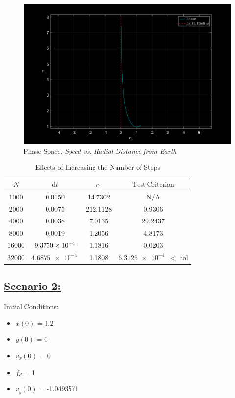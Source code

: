 \documentclass{article}
\newcommand{\cw}{\color{white}}
\begin{document}
\begin{figure}[!h]
    \centering
    \includegraphics[width=\textwidth]{fig/phase1.png}
    \caption{Phase Space, \textit{Speed vs. Radial Distance from Earth}}
    \label{fig2}
\end{figure}


\begin{table}[h]
    \centering
    \caption{\cw Effects of Increasing the Number of Steps}
    \begin{tabular}{cccc} \toprule
        {$N$} & {$\mathrm{d}t$} & {$r_1$} & {$\mathrm{Test \ Criterion}$} \\ \midrule
        1000  & 0.0150 & 14.7302 & N/A  \\
        2000  & 0.0075  & 212.1128 & 0.9306   \\
        4000  & 0.0038  & 7.0135 & 29.2437   \\ 
        8000  & 0.0019  & 1.2056 & 4.8173   \\
        16000 & $\SI{9.3750E-4}{}$ & 1.1816 & 0.0203 \\
        32000 & $\SI{4.6875e-4}{}$ & 1.1808 & \color{magenta}$\SI{6.3125e-4}{}$ \cw $<$ tol \\ \bottomrule
    \end{tabular}
    \label{tab:table1}
\end{table}



\pagebreak

\subsection*{\underline{Scenario 2:}}

Initial Conditions:
\begin{multicols}{4}
   \begin{itemize}
        \item $x(0)$ = 1.2
        \item $y(0)$ = 0
        \item $v_x(0)$ = 0
        \item $f_d$ = 1
        \item $v_y(0)$ = -1.0493571
  \end{itemize}
\end{multicols}
\end{document}
